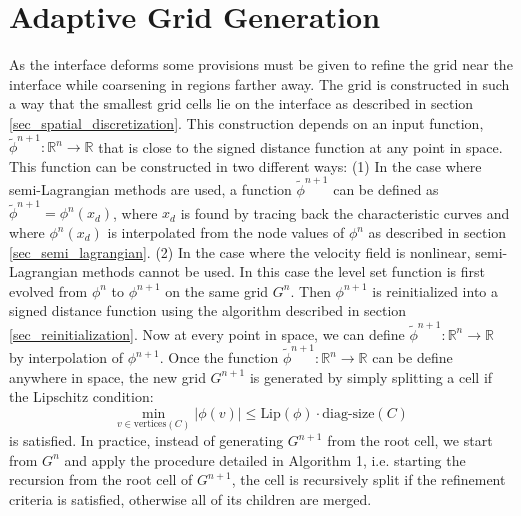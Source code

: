 \documentclass[english]{article}
\begin{document}
%
%
%
\section{Adaptive Grid Generation}
As the interface deforms some provisions must be given to refine the grid
near the interface while coarsening in regions farther away. The grid is
constructed in such a way that the smallest grid cells lie on the interface
as described in section \ref{sec_spatial_discretization}. This construction
depends on an input function,
$\tilde{\phi}^{n+1}:\mathbb{R}^n\to\mathbb{R}$ that is close to the signed
distance function at any point in space. This function can be constructed
in two different ways: (1) In the case where semi-Lagrangian methods are
used, a function $\tilde{\phi}^{n+1}$ can be defined as
$\tilde{\phi}^{n+1}=\phi^n(x_d)$, where $x_d$ is found by tracing back the
characteristic curves and where $\phi^n(x_d)$ is interpolated from the node
values of $\phi^n$ as described in section \ref{sec_semi_lagrangian}. (2)
In the case where the velocity field is nonlinear, semi-Lagrangian methods
cannot be used. In this case the level set function is first evolved from
$\phi^{n}$ to $\phi^{n+1}$ on the same grid $G^n$. Then $\phi^{n+1}$ is
reinitialized into a signed distance function using the algorithm described
in section \ref{sec_reinitialization}. Now at every point in space, we can
define $\tilde{\phi}^{n+1}:\mathbb{R}^n\to\mathbb{R}$ by interpolation of
$\phi^{n+1}$. Once the function
$\tilde{\phi}^{n+1}:\mathbb{R}^n\to\mathbb{R}$ can be define anywhere in
space, the new grid $G^{n+1}$ is generated by simply splitting a cell if
the Lipschitz condition: $$\min_{v\in \textrm{vertices}(C)}|\phi(v)| \le
\textrm{Lip}(\phi)\cdot \textrm{diag-size}(C)$$ is satisfied. In practice,
instead of generating $G^{n+1}$ from the root cell, we start from $G^n$ and
apply the procedure detailed in Algorithm 1, i.e. starting the recursion
from the root cell of $G^{n+1}$, the cell is recursively split if the
refinement criteria is satisfied, otherwise all of its children are merged.
\end{document}
